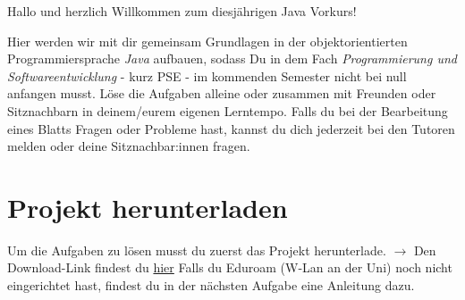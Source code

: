 \begin{center}
	Hallo und herzlich Willkommen zum diesjährigen Java Vorkurs!\\
\end{center}
Hier werden wir mit dir gemeinsam Grundlagen in der objektorientierten Programmiersprache \textit{Java} aufbauen, sodass Du in dem Fach \textit{Programmierung und Softwareentwicklung} - kurz PSE - im kommenden Semester nicht bei null anfangen musst.\newline
Löse die Aufgaben alleine oder zusammen mit Freunden oder Sitznachbarn in deinem/eurem eigenen Lerntempo.\newline
Falls du bei der Bearbeitung eines Blatts Fragen oder Probleme hast, kannst du dich jederzeit bei den Tutoren melden oder deine Sitznachbar:innen fragen.\newline

\section*{Projekt herunterladen}
Um die Aufgaben zu lösen musst du zuerst das Projekt herunterlade.\newline
$\rightarrow$ Den Download-Link findest du \href{\jvkpackageurl}{hier}\newline
Falls du Eduroam (W-Lan an der Uni) noch nicht eingerichtet hast, findest du in der nächsten Aufgabe eine Anleitung dazu.
\newpage
